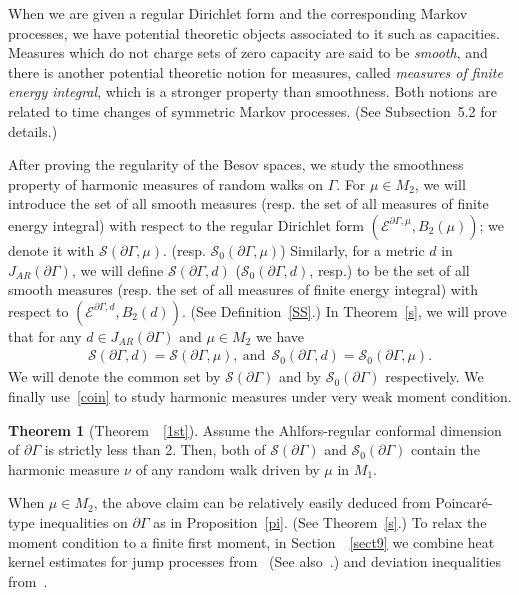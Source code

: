\documentclass[10pt]{amsart}
\newtheorem{theo}{Theorem}[section]
\theoremstyle{definition}\newtheorem{defi}[theo]{Definition}\newtheorem{rema}[theo]{Remark}\newtheorem{exam}[theo]{Example}\newtheorem{exem}[theo]{Example}\newtheorem{nota}[theo]{Notation}
\newcommand{\ce}{\mathcal{E}}
\newcommand{\cs}{\mathcal{S}}
\newtheorem{innercustomthm}{Theorem}
\begin{document}
When we are given a regular Dirichlet form and the corresponding Markov processes, we have potential theoretic objects associated to it such as capacities. Measures which do not charge sets of zero capacity are said to be \emph{smooth}, and there is another potential theoretic notion for measures, called \emph{measures of finite energy integral}, which is a stronger property than smoothness. Both notions are related to time changes of symmetric Markov processes. (See Subsection~5.2 for details.)



After proving the regularity of the Besov spaces, we study the smoothness property of harmonic measures of random walks on $\Gamma$. For $\mu\in M_2$, we will introduce the set of all smooth measures (resp. the set of all measures of finite energy integral) with respect to the regular Dirichlet form $(\ce^{\partial\Gamma,\mu},B_2(\mu))$; we denote it with $\cs(\partial\Gamma,\mu)$. (resp. $\cs_0(\partial\Gamma,\mu)$) Similarly, for a metric $d$ in $J_{AR}(\partial\Gamma)$, we will define $\cs(\partial\Gamma,d)$ ($\cs_0(\partial\Gamma,d)$, resp.) to be the set of all smooth measures (resp. the set of all measures of finite energy integral) with respect to $(\ce^{\partial\Gamma,d},B_2(d))$. (See Definition~\ref{SS}.) In Theorem~\ref{s}, we will prove that for any $d\in J_{AR}(\partial\Gamma)$ and $\mu\in M_2$ we have
\begin{align}\label{coin}
\cs(\partial\Gamma,d)=\cs(\partial\Gamma,\mu),\ \text{and}\ \ \cs_0(\partial\Gamma,d)=\cs_0(\partial\Gamma,\mu).
\end{align}
We will denote the common set by $\cs(\partial\Gamma)$ and by $\cs_0(\partial\Gamma)$ respectively. We finally use~\eqref{coin} to study harmonic measures under very weak moment condition.


\begin{innercustomthm}[{Theorem~~\ref{1st}}]
Assume the Ahlfors-regular conformal dimension of $\partial\Gamma$ is strictly less than 2. Then, both of $\cs(\partial \Gamma)$ and $\cs_0(\partial\Gamma)$ contain the harmonic measure $\nu$ of any random walk driven by $\mu$ in $M_1$.
\end{innercustomthm}
When $\mu\in M_2$, the above claim can be relatively easily deduced from Poincaré-type inequalities on $\partial \Gamma$ as in Proposition~\ref{pi}. (See Theorem~\ref{s}.) To relax the moment condition to a finite first moment, in Section~~\ref{sect9} we combine heat kernel estimates for jump processes from~\cite{GHH} (See also~\cite{CK,CKW}.) and deviation inequalities from~\cite{MS}.
\end{document}

